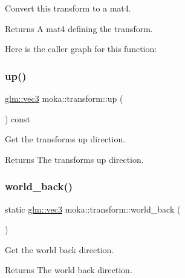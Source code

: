Convert this transform to a mat4. 

\begin{DoxyReturn}{Returns}
A mat4 defining the transform. 
\end{DoxyReturn}
Here is the caller graph for this function\+:
\mbox{\label{classmoka_1_1transform_a0f118e1b139568b3ca6722472c6ccfbd}} 
\subsubsection{\texorpdfstring{up()}{up()}}
{\footnotesize\ttfamily \mbox{\hyperlink{namespacemoka_aed2224bc0e5b79e57a8975ded94ee1aaa97ade28e93c0de60adc075bdbe07ca36}{glm\+::vec3}} moka\+::transform\+::up (\begin{DoxyParamCaption}{ }\end{DoxyParamCaption}) const}



Get the transform\textquotesingle{}s up direction. 

\begin{DoxyReturn}{Returns}
The transform\textquotesingle{}s up direction. 
\end{DoxyReturn}
\mbox{\label{classmoka_1_1transform_a661f13baaf1d034140bee8c053e54d2d}} 
\subsubsection{\texorpdfstring{world\_back()}{world\_back()}}
{\footnotesize\ttfamily static \mbox{\hyperlink{namespacemoka_aed2224bc0e5b79e57a8975ded94ee1aaa97ade28e93c0de60adc075bdbe07ca36}{glm\+::vec3}} moka\+::transform\+::world\+\_\+back (\begin{DoxyParamCaption}{ }\end{DoxyParamCaption})\hspace{0.3cm}{\ttfamily [static]}}



Get the world back direction. 

\begin{DoxyReturn}{Returns}
The world back direction. 
\end{DoxyReturn}
\mbox{\label{classmoka_1_1transform_acf33dea012bcc221745c459be7060436}} 
